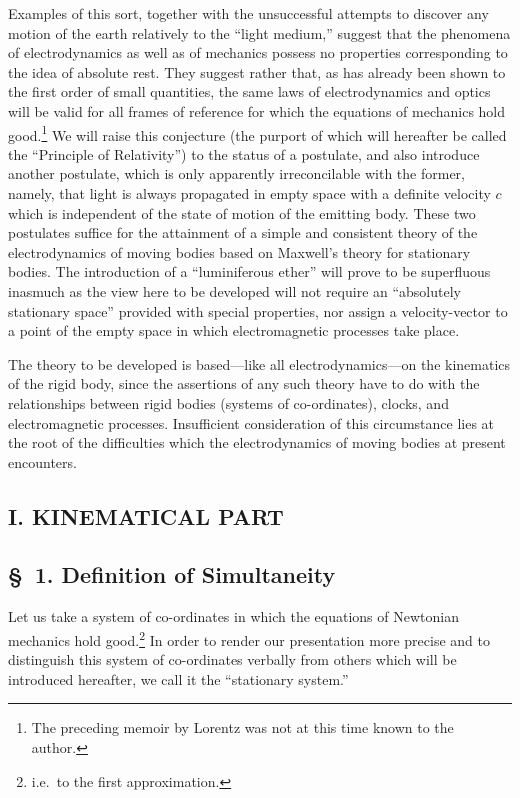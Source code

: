 \documentclass{article}
\begin{document}
Examples of this sort, together with the unsuccessful attempts to
discover any motion of the earth relatively to the ``light medium,''
suggest that the phenomena of electrodynamics as well as of mechanics
possess no properties corresponding to the idea of absolute rest.
They suggest rather that, as has already been shown to the first order
of small quantities, the same laws of electrodynamics and optics will
be valid for all frames of reference for which the equations of
mechanics hold
good.\footnote{The preceding memoir by Lorentz was not at this time known
to the author.}
We will raise this conjecture (the purport of
which will hereafter be called the ``Principle of Relativity'') to the
status of a postulate, and also introduce another postulate, which is
only apparently irreconcilable with the former, namely, that light is
always propagated in empty space with a definite velocity $c$ which is
independent of the state of motion of the emitting body.  These two
postulates suffice for the attainment of a simple and consistent
theory of the electrodynamics of moving bodies based on Maxwell's
theory for stationary bodies.  The introduction of a ``luminiferous
ether'' will prove to be superfluous inasmuch as the view here to be
developed will not require an ``absolutely stationary space'' provided
with special properties, nor assign a velocity-vector to a point of
the empty space in which electromagnetic processes take place.

The theory to be developed is based---like all electrodynamics---on the
kinematics of the rigid body, since the assertions of any such theory
have to do with the relationships between rigid bodies (systems of
co-ordinates), clocks, and electromagnetic processes.  Insufficient
consideration of this circumstance lies at the root of the
difficulties which the electrodynamics of moving bodies at present
encounters.

\begin{center}
\section*{I. KINEMATICAL PART}
\subsection*{\S\ 1. Definition of Simultaneity}
\end{center}

Let us take a system of co-ordinates in which the equations of
Newtonian mechanics hold good.\footnote{i.e.\ to the first approximation.}
In order to render our
presentation more precise and to distinguish this system of
co-ordinates verbally from others which will be introduced hereafter,
we call it the ``stationary system.''
\end{document}
